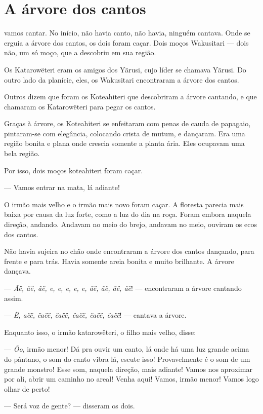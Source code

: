 \chapter{A árvore dos cantos}

 vamos cantar. No início, não havia canto, não havia, ninguém
cantava. Onde se erguia a árvore dos cantos, os dois foram caçar. Dois
moços Wakusitari --- dois não, um só moço, que a descobriu em sua região.

Os Katarowëteri eram os amigos dos Yãrusi, cujo líder se chamava Yãrusi.
Do outro lado da planície, eles, os Wakusitari encontraram a árvore dos
cantos. 

Outros dizem que foram os Koteahiteri que descobriram a árvore cantando,
e que chamaram os Katarowëteri para pegar os cantos. 

Graças à árvore, os Koteahiteri se enfeitaram com penas de cauda de
papagaio, pintaram-se com elegância, colocando crista de mutum, e
dançaram. Era uma região bonita e plana onde crescia somente a planta
ária. Eles ocupavam uma bela região. 

Por isso, dois moços koteahiteri foram caçar. 

--- Vamos entrar na mata, lá adiante! 

O irmão mais velho e o irmão mais novo foram caçar. A floresta parecia
mais baixa por causa da luz forte, como a luz do dia na roça. Foram
embora naquela direção, andando. Andavam no meio do brejo, andavam no
meio, ouviram os ecos dos cantos. 

Não havia sujeira no chão onde encontraram a árvore dos cantos dançando,
para frente e para trás. Havia somente areia bonita e muito brilhante. A
árvore dançava. 

--- \textit{Ãë, ãë, ãë, e, e, e, e, e, ãë, ãë, ãë, ãë}! --- encontraram a árvore
cantando assim. 

--- \textit{Ë, aëë, ëaëë, ëaëë, ëaëë, ëaëë, ëaëë}! --- cantava a árvore. 

Enquanto isso, o irmão katarowëteri, o filho mais velho, disse: 

--- \textit{Õo}, irmão menor! Dá pra ouvir um canto, lá onde há uma luz grande
acima do pântano, o som do canto vibra lá, escute isso! Provavelmente é
o som de um grande monstro! Esse som, naquela direção, mais adiante!
Vamos nos aproximar por ali, abrir um caminho no areal! Venha aqui!
Vamos, irmão menor! Vamos logo olhar de perto! 

--- Será voz de gente? --- disseram os dois. 

